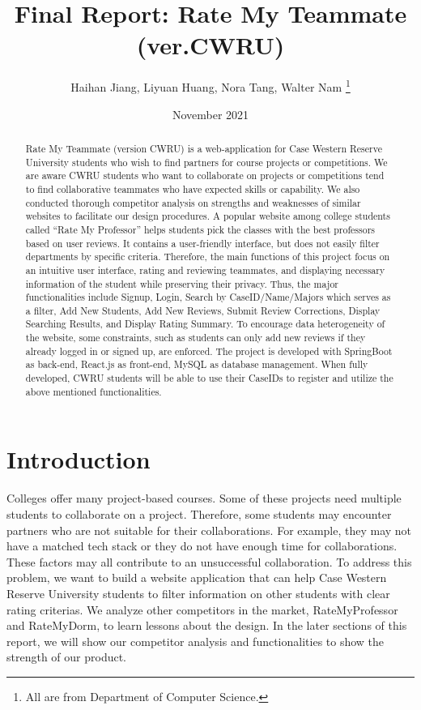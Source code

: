 \documentclass[12pt]{article}
\title{Final Report: Rate My Teammate (ver.CWRU)}
\author{Haihan Jiang, Liyuan Huang, Nora Tang, Walter Nam \footnote{All are from Department of Computer Science.}}
\date{November 2021}
\begin{document}
\maketitle
\begin{abstract}
    Rate My Teammate (version CWRU) is a web-application for Case Western Reserve University students who wish to find partners for course projects or competitions. We are aware CWRU students who want to collaborate on projects or competitions tend to find collaborative teammates who have expected skills or capability. 
We also conducted thorough competitor analysis on strengths and weaknesses of similar websites to facilitate our design procedures. A popular website among college students called “Rate My Professor” helps students pick the classes with the best professors based on user reviews. It contains a user-friendly interface, but does not easily filter departments by specific criteria. Therefore, the main functions of this project focus on an intuitive user interface, rating and reviewing teammates, and displaying necessary information of the student while preserving their privacy. Thus, the major functionalities include Signup, Login, Search by CaseID/Name/Majors which serves as a filter, Add New Students, Add New Reviews, Submit Review Corrections, Display Searching Results, and Display Rating Summary. To encourage data heterogeneity of the website, some constraints, such as students can only add new reviews if they already logged in or signed up, are enforced. The project is developed with SpringBoot as back-end, React.js as front-end, MySQL as database management. When fully developed, CWRU students will be able to use their CaseIDs to register and utilize the above mentioned functionalities. 

\end{abstract}
\section{Introduction}

	Colleges offer many project-based courses. Some of these projects need multiple students to collaborate on a project. Therefore, some students may encounter partners who are not suitable for their collaborations. For example, they may not have a  matched tech stack or they do not have enough time for collaborations. These factors may all contribute to an unsuccessful collaboration.  
To address this problem, we want to build a website application that can help Case Western Reserve University students to filter information on other students with clear rating criterias. We analyze other competitors in the market, RateMyProfessor and RateMyDorm, to learn lessons about the design. In the later sections of this report, we will show our competitor analysis and functionalities to show the strength of our product. 
\end{document}
